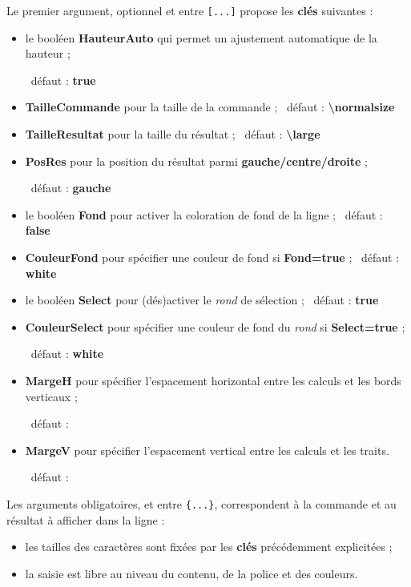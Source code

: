 \documentclass[french,a4paper,11pt]{article}
\newcommand\Cle[1]{{\bfseries\sffamily\textlangle #1\textrangle}}
\newcommand\cmaj[1]{\tcbox[vignetteMaJ]{#1}\xspace}
\begin{document}
\begin{tipblock}
Le premier argument, optionnel et entre \texttt{[...]} propose les \Cle{clés} suivantes :

\begin{itemize}
	\item le booléen \Cle{HauteurAuto} qui permet un ajustement automatique de la hauteur ;
	
	\hfill~défaut : \Cle{true}
	\item \Cle{TailleCommande} pour la taille de la commande ; \hfill~défaut : \Cle{\textbackslash normalsize}
	\item \Cle{TailleResultat} pour la taille du résultat ; \hfill~défaut : \Cle{\textbackslash large}
	\item \cmaj{0.1.3} \Cle{PosRes} pour la position du résultat parmi \Cle{gauche/centre/droite} ;
	
	\hfill~défaut : \Cle{gauche}
	\item le booléen \Cle{Fond} pour activer la coloration de fond de la ligne ; \hfill~défaut : \Cle{false}
	\item \Cle{CouleurFond} pour spécifier une couleur de fond si \Cle{Fond=true} ; \hfill~défaut : \Cle{white}
	\item le booléen \Cle{Select} pour (dés)activer le \textit{rond} de sélection ; \hfill~défaut : \Cle{true}
	\item \Cle{CouleurSelect} pour spécifier une couleur de fond du \textit{rond} si \Cle{Select=true} ;
	
	\hfill~défaut : \Cle{white}
	\item \Cle{MargeH} pour spécifier l'espacement horizontal entre les calculs et les bords verticaux ;
	
	\hfill~défaut : \Cle{0.2}
	\item \Cle{MargeV} pour spécifier l'espacement vertical entre les calculs et les traits.
	
	\hfill~défaut : \Cle{6pt}
\end{itemize}
\vspace*{-\baselineskip}\leavevmode
\end{tipblock}

\begin{tipblock}
Les arguments obligatoires, et entre \texttt{\{...\}}, correspondent à la commande et au résultat à afficher dans la ligne :

\begin{itemize}
	\item les tailles des caractères sont fixées par les \Cle{clés} précédemment explicitées ;
	\item la saisie est libre au niveau du contenu, de la police et des couleurs.
\end{itemize}
\vspace*{-\baselineskip}\leavevmode
\end{tipblock}
\end{document}

